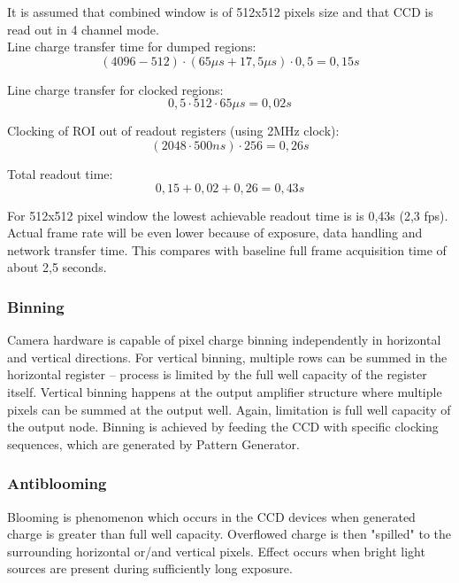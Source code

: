 It is assumed that combined window is of  512x512 pixels size and that CCD is read out in 4 channel mode. \\

Line charge transfer time for dumped regions:
\begin{equation}
(4096-512)\cdot (65\mu s+17,5\mu s) \cdot 0,5=0,15s
\end{equation}


Line charge transfer for clocked regions:
\begin{equation}
0,5 \cdot 512 \cdot 65 \mu s=0,02s
\end{equation}


Clocking of ROI out of readout registers (using 2MHz clock):
\begin{equation}
(2048\cdot 500ns) \cdot 256=0,26s
\end{equation}

Total readout time:
\begin{equation}
0,15+0,02+0,26=0,43s
\end{equation}

For 512x512 pixel window the lowest achievable readout time is is 0,43s (2,3 fps). Actual frame rate will be even lower because of exposure, data handling and network transfer time. This compares with baseline full frame acquisition time of about 2,5 seconds.

\newpage
\subsubsection{Binning}
Camera hardware is capable of pixel charge binning independently in horizontal and vertical directions. For vertical binning, multiple rows can be summed in the horizontal register -- process is limited by the full well capacity of the register itself. Vertical binning happens at the output amplifier structure where multiple pixels can be summed at the output well. Again, limitation is full well capacity of the output node. Binning is achieved by feeding the CCD with specific clocking sequences, which are generated by Pattern Generator. 

\subsubsection{Antiblooming}

Blooming is phenomenon which occurs in the CCD devices when generated charge is greater than full well capacity. Overflowed charge is then "spilled" to the surrounding horizontal or/and vertical pixels. Effect occurs when bright light sources are present during sufficiently long exposure.

